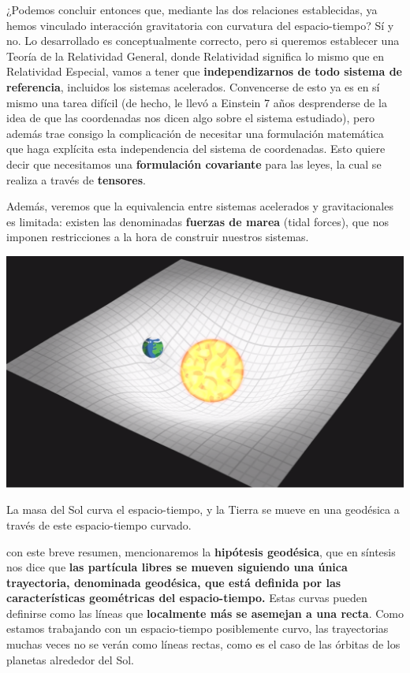 ¿Podemos concluir entonces que, mediante las dos relaciones establecidas, ya hemos vinculado interacción gravitatoria con curvatura del espacio-tiempo? Sí y no. Lo desarrollado es conceptualmente correcto, pero si queremos establecer una Teoría de la Relatividad General, donde Relatividad significa lo mismo que en Relatividad Especial, vamos a tener que \textbf{independizarnos de todo sistema de referencia}, incluidos los sistemas acelerados. Convencerse de esto ya es en sí mismo una tarea difícil (de hecho, le llevó a Einstein 7 años desprenderse de la idea de que las coordenadas nos dicen algo sobre el sistema estudiado\cite[][p.2-4]{wheeler}), pero además trae consigo la complicación de necesitar una formulación matemática que haga explícita esta independencia del sistema de coordenadas. Esto quiere decir que necesitamos una \textbf{formulación covariante} para las leyes, la cual se realiza a través de \textbf{tensores}\cite[][p.247]{landau2}.

Además, veremos que la equivalencia entre sistemas acelerados y gravitacionales es limitada: existen las denominadas \textbf{fuerzas de marea} (tidal forces), que nos imponen restricciones a la hora de construir nuestros sistemas. 

\begin{marginfigure}
\captionsetup{type=figure}
    \centering
    \includegraphics[width=1.3\textwidth]{Im/sistsolar.png}
    \caption{La masa del Sol curva el espacio-tiempo, y la Tierra se mueve en una geodésica a través de este espacio-tiempo curvado.}
    \label{fig:sen}
\end{marginfigure}

 con este breve resumen, mencionaremos la \textbf{hipótesis geodésica}, que en síntesis nos dice que \textbf{las partícula libres se mueven siguiendo una única trayectoria, denominada geodésica, que está definida por las características geométricas del espacio-tiempo.} Estas curvas pueden definirse como las líneas que \textbf{localmente más se asemejan a una recta}. Como estamos trabajando con un espacio-tiempo posiblemente curvo, las trayectorias muchas veces no se verán como líneas rectas, como es el caso de las órbitas de los planetas alrededor del Sol. 


